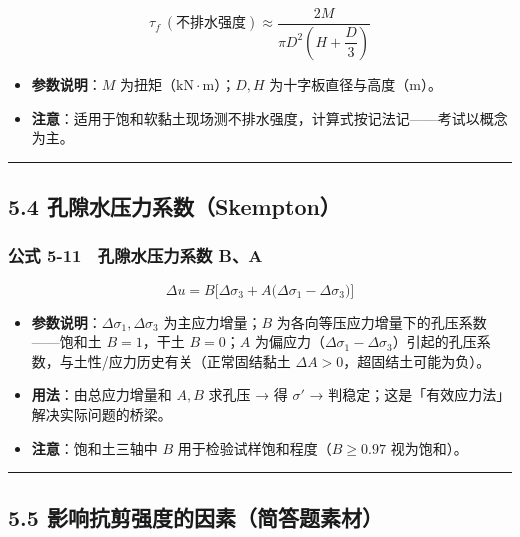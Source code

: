 \documentclass[
]{article}
\providecommand{\tightlist}{%
  \setlength{\itemsep}{0pt}\setlength{\parskip}{0pt}}
\begin{document}
\[\tau_f\ (\text{不排水强度}) \approx \frac{2M}{\pi D^2\left(H+\dfrac{D}{3}\right)}\]

\begin{itemize}
\tightlist
\item
  \textbf{参数说明}：\(M\) 为扭矩（\(\mathrm{kN\cdot m}\)）；\(D,H\)
  为十字板直径与高度（m）。
\item
  \textbf{注意}：适用于饱和软黏土现场测不排水强度，计算式按记法记------考试以概念为主。
\end{itemize}

\begin{center}\rule{0.5\linewidth}{0.5pt}\end{center}

\subsection{5.4
孔隙水压力系数（Skempton）}\label{ux5b54ux9699ux6c34ux538bux529bux7cfbux6570skempton}

\subsubsection{公式 5-11　孔隙水压力系数
B、A}\label{ux516cux5f0f-5-11-ux5b54ux9699ux6c34ux538bux529bux7cfbux6570-ba}

\[\Delta u=B\Big[\Delta\sigma_3+A\big(\Delta\sigma_1-\Delta\sigma_3\big)\Big]\]

\begin{itemize}
\tightlist
\item
  \textbf{参数说明}：\(\Delta\sigma_1,\Delta\sigma_3\)
  为主应力增量；\(B\) 为各向等压应力增量下的孔压系数------饱和土
  \(B=1\)，干土 \(B=0\)；\(A\)
  为偏应力（\(\Delta\sigma_1-\Delta\sigma_3\)）引起的孔压系数，与土性/应力历史有关（正常固结黏土
  \(\Delta A>0\)，超固结土可能为负）。
\item
  \textbf{用法}：由总应力增量和 \(A,B\) 求孔压 → 得 \(\sigma'\) →
  判稳定；这是「有效应力法」解决实际问题的桥梁。
\item
  \textbf{注意}：饱和土三轴中 \(B\) 用于检验试样饱和程度（\(B\ge0.97\)
  视为饱和）。
\end{itemize}

\begin{center}\rule{0.5\linewidth}{0.5pt}\end{center}

\subsection{5.5
影响抗剪强度的因素（简答题素材）}\label{ux5f71ux54cdux6297ux526aux5f3aux5ea6ux7684ux56e0ux7d20ux7b80ux7b54ux9898ux7d20ux6750}
\end{document}
